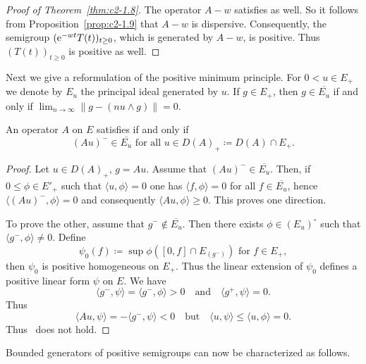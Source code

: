 \begin{proof}[Proof of Theorem~\ref{thm:c2-1.8}]
%
The operator $A - w$ satisfies  
as well.
So it follows from Proposition~\ref{prop:c2-1.9}   that $A - w$ is dispersive.
Consequently, the semigroup\/ $(\eu^{-wt}T(t))_{t \geq 0}$, which is generated by $A - w$, is positive.
Thus $(T(t))_{t \geq 0}$ is positive as well.
\end{proof}
Next we give a reformulation of the positive minimum principle.
For $0 < u \in E_{+}$ we denote by $E_{u}$ the principal ideal generated by $u$.
If\/ $g \in E_{+}$, then $g \in \overline{E_{u}}$ if and only if\/ $\lim_{n \to \infty} \|g - (n u \wedge g)\| = 0$.
\begin{lemma}\label{lem:c2-1.10}
%
An operator $A$ on $E$ satisfies  if and only if
\begin{equation}\label{eq:c2-1.8}
(Au)^{-} \in \overline{E_{u}} \text{ for all } u \in D(A)_{+} \coloneq D(A) \cap E_{+}.
\end{equation}
\end{lemma}
\begin{proof}
Let $u \in D(A)_{+}$, $g = Au$.
Assume that $(Au)^{-} \in \overline{E_{u}}$.
Then, if\/ $0 \leq \phi \in E'_{+}$ such that $\langle u,\phi \rangle = 0$ one has $\langle f,\phi \rangle = 0$ for all $f \in \overline{E_{u}}$, hence $\langle (Au)^{-},\phi \rangle = 0$ and consequently $\langle Au,\phi \rangle \geq 0$.
This proves one direction.

To prove the other, assume that $g^{-} \not\in \overline{E_{u}}$.
Then there exists $\phi \in (E_{u})^{\circ}$ such that $\langle g^{-},\phi \rangle \not= 0$.
Define 
\[
\psi_{0}(f) \coloneq \sup \phi([0,f] \cap E_{(g^{-})}) \text{ for } f \in E_{+} ,
\]
then $\psi_{0}$ is positive homogeneous on $E_{+}$.
Thus the linear extension of\/ $\psi_{0}$ defines a positive linear form $\psi$ on $E$.
We have 
\[
\langle g^{-},\psi \rangle = \langle g^{-},\phi \rangle > 0 \quad\text{and}\quad \langle g^{+},\psi \rangle = 0 .
\]
Thus 
\[
\langle Au,\psi \rangle = - \langle g^{-},\psi \rangle < 0\quad\text{but} \quad\langle u,\psi \rangle \leq \langle u,\phi \rangle = 0 .
\]
Thus~   does not hold.
\end{proof}
Bounded generators of positive semigroups can now be characterized as follows.
